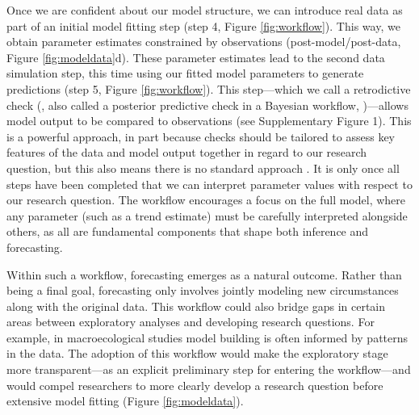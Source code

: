 \documentclass[11pt]{article}
\newcommand{\llabel}[1]{\hypertarget{lintarget:#1}{}\linelabel{lin:#1}}
\begin{document}
Once we are confident about our model structure, we can introduce real data as part of an initial model fitting step (step 4, Figure \ref{fig:workflow}). This way, we obtain parameter estimates constrained by observations (\llabel{quad7}post-model/post-data, Figure \ref{fig:modeldata}d). 
These parameter estimates lead to the second data simulation step, this time using our fitted model parameters to generate predictions (step 5, Figure \ref{fig:workflow}). This step---which we call a retrodictive check (\citealp{betanworkflow}, also called a \llabel{PPC}posterior predictive check in a Bayesian workflow,  \citealp{Gelman2020})---allows model output to be compared to observations \llabel{suppfig1}(see Supplementary Figure 1). \llabel{howtoPPC} This is a powerful approach, in part because checks should be tailored to assess key features of the data and model output together in regard to our research question, but this also means there is no standard approach  \citep{Gelman2020}.
It is only once all steps have been completed that we can interpret parameter values with respect to our research question.
The workflow encourages a focus on the full model, where any parameter (such as a trend estimate) must be carefully interpreted alongside others, as all are fundamental components that shape both inference and forecasting. 

Within such a workflow, forecasting emerges as a natural outcome. Rather than being a final goal, forecasting only involves jointly modeling new circumstances along with the original data. This workflow could also bridge gaps in certain areas between exploratory analyses and developing research questions. For example, in macroecological studies model building is often informed by patterns in the data. The adoption of this workflow would make the exploratory stage more transparent---as an explicit preliminary step for entering the workflow---and would compel researchers to more clearly develop a research question before extensive model fitting (Figure \ref{fig:modeldata}). 
\end{document}
